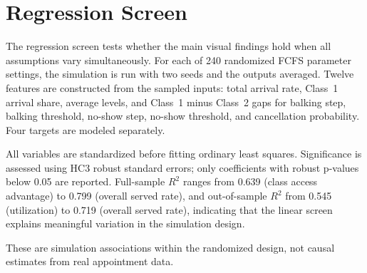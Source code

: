 \documentclass[11pt]{article}
\begin{document}
\section{Regression Screen}
\label{sec:regression}

The regression screen tests whether the main visual findings hold when all
assumptions vary simultaneously. For each of 240 randomized FCFS parameter
settings, the simulation is run with two seeds and the outputs averaged.
Twelve features are constructed from the sampled inputs: total arrival rate,
Class~1 arrival share, average levels, and Class~1 minus Class~2 gaps for
balking step, balking threshold, no-show step, no-show threshold, and
cancellation probability. Four targets are modeled separately.

All variables are standardized before fitting ordinary least squares.
Significance is assessed using HC3 robust standard errors; only coefficients
with robust p-values below 0.05 are reported. Full-sample $R^2$ ranges from
0.639 (class access advantage) to 0.799 (overall served rate), and
out-of-sample $R^2$ from 0.545 (utilization) to 0.719 (overall served rate),
indicating that the linear screen explains meaningful variation in the
simulation design.

These are simulation associations within the randomized design, not
causal estimates from real appointment data.
\end{document}
